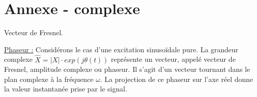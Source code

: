 \chapter*{Annexe - complexe}
	Vecteur de Fresnel.
	
	\underline{Phaseur :}
	Considérons le cas d'une excitation sinusoïdale pure. La grandeur
	complexe $ \hat{X} =|X| \cdot exp(j \theta(t)) $ représente un vecteur, appelé vecteur de Fresnel, amplitude complexe ou phaseur. Il
	s'agit d'un vecteur tournant dans le plan complexe à la fréquence $\omega$. La
	projection de ce phaseur sur l'axe réel donne la valeur instantanée
	prise par le signal.
	
	